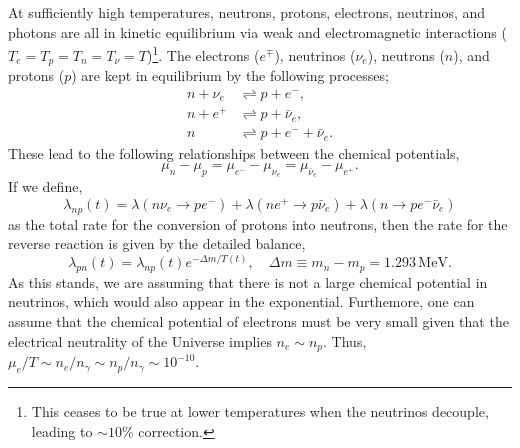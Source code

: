 \documentclass[11pt]{article}
\numberwithin{equation}{section}
\numberwithin{figure}{section}
\numberwithin{table}{section}
\begin{document}
At sufficiently high temperatures, neutrons, protons, electrons, neutrinos, and photons are all in kinetic equilibrium via weak and electromagnetic interactions ($T_e = T_p = T_n = T_\nu = T$)\footnote{This ceases to be true at lower temperatures when the neutrinos decouple, leading to $\sim 10 \%$ correction.}. The electrons ($e^{\mp}$), neutrinos ($\nu_e$), neutrons ($n$), and protons ($p$) are kept in equilibrium by the following processes;
\begin{align}
n + \nu_e &\rightleftharpoons p + e^{-}, \\
n + e^{+} &\rightleftharpoons p + \bar{\nu}_e, \\
n &\rightleftharpoons p + e^{-} + \bar{\nu}_e.
\end{align}
These lead to the following relationships between the chemical potentials,
\begin{equation}
\mu_n - \mu_p = \mu_{e^{-}} - \mu_{\nu_e} = \mu_{\bar{\nu}_e} - \mu_{e^{+}}.
\end{equation}
If we define,
\begin{equation}
\lambda_{np}(t) = \lambda(n \nu_e \rightarrow p e^{-}) + \lambda(n e^{+} \rightarrow p \bar{\nu}_e) + \lambda(n \rightarrow p e^{-} \bar{\nu}_e)
\end{equation}
as the total rate for the conversion of protons into neutrons, then the rate for the reverse reaction is given by the detailed balance,
\begin{equation}
\lambda_{pn}(t) = \lambda_{np}(t) e^{-\Delta m/T(t)}, \quad \Delta m \equiv m_n - m_p = 1.293 \, \mathrm{MeV}. \label{eq:rates}
\end{equation}
As this stands, we are assuming that there is not a large chemical potential in neutrinos, which would also appear in the exponential. Furthemore, one can assume that the chemical potential of electrons must be very small given that the electrical neutrality of the Universe implies $n_e \sim n_p$. Thus, $\mu_e/T \sim n_e/n_\gamma \sim n_p/n_\gamma \sim 10^{-10}$.
\end{document}
